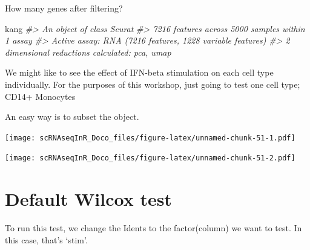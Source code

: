 \documentclass[
]{book}
\newenvironment{Shaded}{\begin{snugshade}}{\end{snugshade}}
\newcommand{\CommentTok}[1]{\textcolor[rgb]{0.56,0.35,0.01}{\textit{#1}}}
\newcommand{\FunctionTok}[1]{\textcolor[rgb]{0.13,0.29,0.53}{\textbf{#1}}}
\newcommand{\NormalTok}[1]{#1}
\newcommand{\OtherTok}[1]{\textcolor[rgb]{0.56,0.35,0.01}{#1}}
\newcommand{\SpecialCharTok}[1]{\textcolor[rgb]{0.81,0.36,0.00}{\textbf{#1}}}
\newcommand{\StringTok}[1]{\textcolor[rgb]{0.31,0.60,0.02}{#1}}
\begin{document}
How many genes after filtering?

\begin{Shaded}
\begin{Highlighting}[]
\NormalTok{kang}
\CommentTok{\#\textgreater{} An object of class Seurat }
\CommentTok{\#\textgreater{} 7216 features across 5000 samples within 1 assay }
\CommentTok{\#\textgreater{} Active assay: RNA (7216 features, 1228 variable features)}
\CommentTok{\#\textgreater{}  2 dimensional reductions calculated: pca, umap}
\end{Highlighting}
\end{Shaded}

We might like to see the effect of IFN-beta stimulation on each cell type individually. For the purposes of this workshop, just going to test one cell type; CD14+ Monocytes

An easy way is to subset the object.

\begin{Shaded}
\end{Shaded}

\texttt{[image: scRNAseqInR\_Doco\_files/figure-latex/unnamed-chunk-51-1.pdf]}

\begin{Shaded}
\end{Shaded}

\texttt{[image: scRNAseqInR\_Doco\_files/figure-latex/unnamed-chunk-51-2.pdf]}

\hypertarget{default-wilcox-test}{%
\section{Default Wilcox test}\label{default-wilcox-test}}

To run this test, we change the Idents to the factor(column) we want to test. In this case, that's `stim'.
\end{document}
